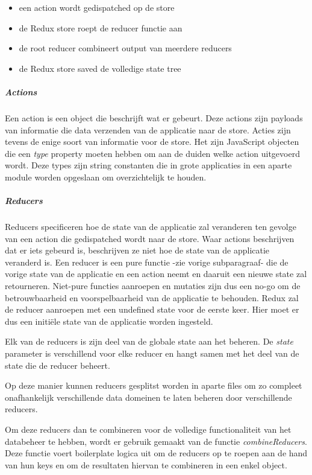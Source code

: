 \begin{itemize}
	\item een action wordt gedispatched op de store
	\item de Redux store roept de reducer functie aan
	\item de root reducer combineert output van meerdere reducers
	\item de Redux store saved de volledige state tree
\end{itemize}

\subparagraph{Actions}
Een action is een object die beschrijft wat er gebeurt.
Deze actions zijn payloads van informatie die data verzenden van de applicatie naar de store. Acties zijn tevens de enige soort van informatie voor de store. Het zijn JavaScript objecten die een \textit{type} property moeten hebben om aan de duiden welke action uitgevoerd wordt. Deze types zijn string constanten die in grote applicaties in een aparte module worden opgeslaan om overzichtelijk te houden. 
\autocite{actions}

\subparagraph{Reducers}
Reducers specificeren hoe de state van de applicatie zal veranderen ten gevolge van een action die gedispatched wordt naar de store. Waar actions beschrijven dat er iets gebeurd is, beschrijven ze niet hoe de state van de applicatie veranderd is. Een reducer is een pure functie -zie vorige subparagraaf- die de vorige state van de applicatie en een action neemt en daaruit een nieuwe state zal retourneren. 
Niet-pure functies aanroepen en mutaties zijn dus een no-go om de betrouwbaarheid en voorspelbaarheid van de applicatie te behouden. Redux zal de reducer aanroepen met een undefined state voor de eerste keer. Hier moet er dus een initiële state van de applicatie worden ingesteld.

Elk van de reducers is zijn deel van de globale state aan het beheren. De \textit{state} parameter is verschillend voor elke reducer en hangt samen met het deel van de state die de reducer beheert.

Op deze manier kunnen reducers gesplitst worden in aparte files om zo compleet onafhankelijk verschillende data domeinen te laten beheren door verschillende reducers. 

Om deze reducers dan te combineren voor de volledige functionaliteit van het databeheer te hebben, wordt er gebruik gemaakt van de functie \textit{combineReducers}. Deze functie voert boilerplate logica uit om de reducers op te roepen aan de hand van hun keys en om de resultaten hiervan te combineren in een enkel object. 
\autocite{reducers}


